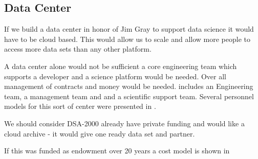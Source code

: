 \subsection{Data Center} \label{sec:dc}

If we build a data center in honor of Jim Gray to support data science  it would have to be cloud based.
This would allow us to scale and allow more people to access more data sets than any other platform.

A data center alone would not be sufficient a core engineering team which supports a developer and a science platform would be needed.
Over all management of contracts and money would be needed.
 includes an Engineering team, a management team and and a scientific support team.
Several personnel models for this sort of center were presented in \cite{2023arXiv231104272B}.

We should consider DSA-2000 already have private funding and would like a cloud archive - it would give one ready data set and partner.



If this was funded as endowment over 20 years a cost model is shown in 





